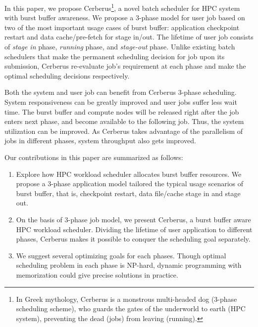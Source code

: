 In this paper, we propose Cerberus\footnote{In Greek mythology,
Cerberus is a monstrous multi-headed dog (3-phase scheduling scheme),
who guards the gates of the underworld to earth (HPC system),
preventing the dead (jobs) from leaving (running).},
a novel batch scheduler for HPC system with burst buffer awareness. 
We propose a 3-phase model for user job 
based on two of the most important usage cases of burst buffer: 
application checkpoint restart and data cache/pre-fetch for stage in/out. 
The lifetime of user job consists of \textit{stage in} phase, 
\textit{running} phase, and \textit{stage-out} phase. 
Unlike existing batch schedulers that 
make the permanent scheduling decision for job upon its submission, 
Cerberus re-evaluate job's requirement at each phase 
and make the optimal scheduling decisions respectively.

Both the system and user job can benefit from Cerberus 3-phase scheduling.
System responsiveness can be greatly improved and
user jobs suffer less wait time. 
The burst buffer and compute nodes will be released right after the job enters next phase,
and become available to the following job.
Thus, the system utilization can be improved.
As Cerberus takes advantage of the parallelism of jobs in different phases,
system throughput also gets improved.

Our contributions in this paper are summarized as follows:

\begin{enumerate}
        \item Explore how HPC workload scheduler allocates burst buffer resources.
                We propose a 3-phase application model tailored the typical
                usage scenarios of burst buffer, that is, checkpoint restart,
                data file/cache stage in and stage out.
        \item On the basis of 3-phase job model, we present Cerberus,
                a burst buffer aware HPC workload scheduler.
                Dividing the lifetime of user application to different phases,
                Cerberus makes it possible to conquer the scheduling goal separately.
        \item We suggest several optimizing goals for each phases.
                Though optimal scheduling problem in each phase is NP-hard,
                dynamic programming with memorization could give precise solutions
                in practice.
\end{enumerate}

